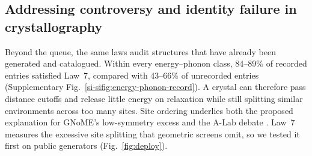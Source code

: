 \subsection{Addressing controversy and identity failure in crystallography}
\label{sec:ordering-identity}

\label{sec:deploy}\label{sec:explain}

Beyond the queue, the same laws audit structures that have already been generated and
catalogued. Within every energy--phonon class, 84--89\% of recorded entries satisfied Law~7,
compared with 43--66\% of unrecorded entries (Supplementary
Fig.~\ref{si-sifig:energy-phonon-record}). A crystal can therefore pass distance cutoffs and
release little energy on relaxation while still splitting similar environments across too
many sites. Site ordering underlies both the proposed explanation for GNoME's low-symmetry
excess \cite{merchant2023scaling,cheetham2024artificial} and the A-Lab debate
\cite{szymanski2023autonomous,leeman2024challenges,szymanski2026correction,yamazaki2026navigating}.
Law~7 measures the excessive site splitting that geometric screens omit, so we tested it
first on public generators (Fig.~\ref{fig:deploy}).

